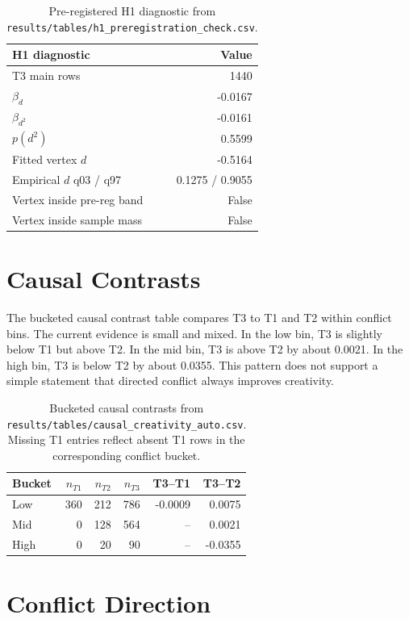 \documentclass[sigconf,nonacm]{acmart}
\begin{document}
\begin{table}[t]
\centering
\small
\begin{tabular}{lr}
\toprule
H1 diagnostic & Value \\
\midrule
T3 main rows & 1440 \\
$\beta_d$ & -0.0167 \\
$\beta_{d^2}$ & -0.0161 \\
$p(d^2)$ & 0.5599 \\
Fitted vertex $d$ & -0.5164 \\
Empirical $d$ q03 / q97 & 0.1275 / 0.9055 \\
Vertex inside pre-reg band & False \\
Vertex inside sample mass & False \\
\bottomrule
\end{tabular}
\caption{Pre-registered H1 diagnostic from \texttt{results/tables/h1\_preregistration\_check.csv}.}
\label{tab:h1}
\end{table}

\section{Causal Contrasts}

The bucketed causal contrast table compares T3 to T1 and T2 within conflict bins.
The current evidence is small and mixed.
In the low bin, T3 is slightly below T1 but above T2.
In the mid bin, T3 is above T2 by about 0.0021.
In the high bin, T3 is below T2 by about 0.0355.
This pattern does not support a simple statement that directed conflict always improves creativity.

\begin{table}[t]
\centering
\small
\begin{tabular}{lrrrrr}
\toprule
Bucket & $n_{T1}$ & $n_{T2}$ & $n_{T3}$ & T3--T1 & T3--T2 \\
\midrule
Low & 360 & 212 & 786 & -0.0009 & 0.0075 \\
Mid & 0 & 128 & 564 & -- & 0.0021 \\
High & 0 & 20 & 90 & -- & -0.0355 \\
\bottomrule
\end{tabular}
\caption{Bucketed causal contrasts from \texttt{results/tables/causal\_creativity\_auto.csv}. Missing T1 entries reflect absent T1 rows in the corresponding conflict bucket.}
\label{tab:causal}
\end{table}

\section{Conflict Direction}
\end{document}
